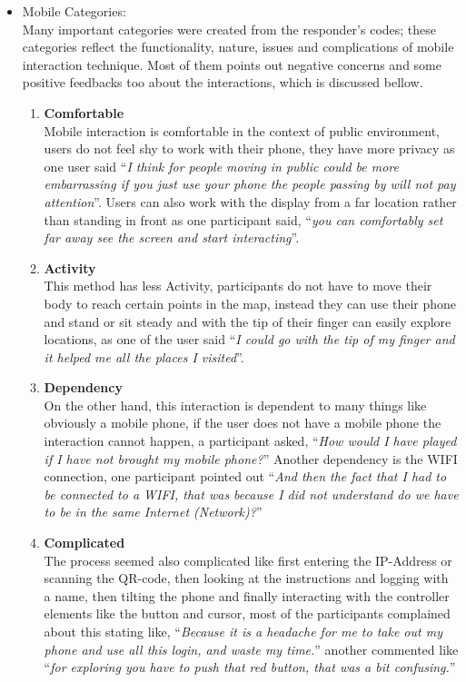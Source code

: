 \begin{itemize}

\item Mobile Categories: \\
Many important categories were created from the responder's codes; these categories reflect the functionality, nature, issues and complications of mobile interaction technique. Most of them points out negative concerns and some positive feedbacks too about the interactions, which is discussed bellow.
\begin{enumerate}
\item	\textbf{Comfortable} \\
	Mobile interaction is comfortable in the context of public environment, users do not feel shy to work with their phone, they have more privacy as one user said ``\emph{I think for people moving in public could be more embarrassing if you just use your phone the people passing by will not pay attention}''. Users can also work with the display from a far location rather than standing in front as one participant said, ``\emph{you can comfortably set far away see the screen and start interacting}''.
\item	\textbf{Activity} \\
	This method has less Activity, participants do not have to move their body to reach certain points in the map, instead they can use their phone and stand or sit steady and with the tip of their finger can easily explore locations, as one of the user said ``\emph{I could go with the tip of my finger and it helped me all the places I visited}''.
\item	\textbf{Dependency}\\
	On the other hand, this interaction is dependent to many things like obviously a mobile phone, if the user does not have a mobile phone the interaction cannot happen, a participant asked, ``\emph{How would I have played if I have not brought my mobile phone?}'' Another dependency is the WIFI connection, one participant pointed out ``\emph{And then the fact that I had to be connected to a WIFI, that was because I did not understand do we have to be in the same Internet (Network)?}'' 

\item	\textbf{Complicated}\\
The process seemed also complicated like first entering the IP-Address or scanning the QR-code, then looking at the instructions and logging with a name, then tilting the phone and finally interacting with the controller elements like the button and cursor, most of the participants complained about this stating like, ``\emph{Because it is a headache for me to take out my phone and use all this login, and waste my time.}'' another commented like ``\emph{for exploring you have to push that red button, that was a bit confusing.}''



\end{enumerate}
\end{itemize}
